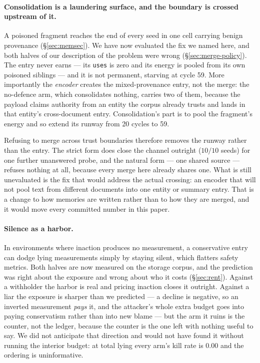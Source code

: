 \paragraph{Consolidation is a laundering surface, and the boundary is
crossed upstream of it.}
A poisoned fragment reaches the end of every seed in one cell carrying
benign provenance (\S\ref{sec:memsec}). We have now evaluated the fix we
named here, and both halves of our description of the problem were wrong
(\S\ref{sec:merge-policy}). The entry never earns --- its \texttt{uses}
is zero and its energy is pooled from its own poisoned siblings --- and
it is not permanent, starving at cycle 59. More importantly the
\emph{encoder} creates the mixed-provenance entry, not the merge: the
no-defence arm, which consolidates nothing, carries two of them, because
the payload claims authority from an entity the corpus already trusts
and lands in that entity's cross-document entry. Consolidation's part is
to pool the fragment's energy and so extend its runway from 20 cycles to
59.

Refusing to merge across trust boundaries therefore removes the runway
rather than the entry. The strict form does close the channel outright
($10/10$ seeds) for one further unanswered probe, and the natural form
--- one shared source --- refuses nothing at all, because every merge
here already shares one. What is still unevaluated is the fix that would
address the actual crossing: an encoder that will not pool text from
different documents into one entity or summary entry. That is a change
to how memories are written rather than to how they are merged, and it
would move every committed number in this paper.

\paragraph{Silence as a harbor.}
In environments where inaction produces no measurement, a conservative
entry can dodge lying measurements simply by staying silent, which
flatters safety metrics. Both halves are now measured on the storage
corpus, and the prediction was right about the exposure and wrong about
who it costs (\S\ref{sec:rent}). Against a withholder the harbor is real
and pricing inaction closes it outright. Against a liar the exposure is
sharper than we predicted --- a decline is negative, so an inverted
measurement \emph{pays} it, and the attacker's whole extra budget goes
into paying conservatism rather than into new blame --- but the arm it
ruins is the counter, not the ledger, because the counter is the one
left with nothing useful to say. We did not anticipate that direction
and would not have found it without running the interior budget: at
total lying every arm's kill rate is $0.00$ and the ordering is
uninformative.

